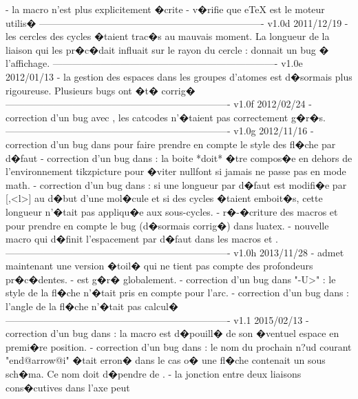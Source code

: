    - la macro \+ n'est plus explicitement �crite
    - v�rifie que eTeX est le moteur utilis�
----------------------------------------------------------------------
v1.0d      2011/12/19
    - les cercles des cycles �taient trac�s au mauvais moment. La
      longueur de la liaison qui les pr�c�dait influait sur le
      rayon du cercle :  donnait un bug
      � l'affichage.
----------------------------------------------------------------------
v1.0e      2012/01/13
    - la gestion des espaces dans les groupes d'atomes est
      d�sormais plus rigoureuse. Plusieurs bugs ont �t�
      corrig�
----------------------------------------------------------------------
v1.0f      2012/02/24
    - correction d'un bug avec , les catcodes n'�taient
      pas correctement g�r�s.
----------------------------------------------------------------------
v1.0g      2012/11/16
    - correction d'un bug dans \CF@direct@arrow pour faire prendre en
      compte le style des fl�che par d�faut
    - correction d'un bug dans \CF@lewis@c : la boite *doit* �tre
      compos�e en dehors de l'environnement tikzpicture pour
      �viter nullfont si jamais \printatom ne passe pas en mode
      math.
    - correction d'un bug dans \CF@chemfig@e : si une longueur par
      d�faut est modifi�e par [,<l>] au d�but d'une mol�cule
      et si des cycles �taient emboit�s, cette longueur n'�tait
      pas appliqu�e aux sous-cycles.
    - r�-�criture des macros \chemabove et \chembemow pour
      prendre en compte le bug (d�sormais corrig�) dans luatex.
    - nouvelle macro \setstacksep qui d�finit l'espacement par
      d�faut dans les macros \chemabove et \chembelow.
----------------------------------------------------------------------
v1.0h      2013/11/28
    - \chemname admet maintenant une version �toil� qui ne tient
      pas compte des profondeurs pr�c�dentes.
    - \CF@dp@max est g�r� globalement.
    - correction d'un bug dans "-U>" : le style de la fl�che
      n'�tait pris en compte pour l'arc.
    - correction d'un bug dans \CF@direct@arrow : l'angle de la
      fl�che n'�tait pas calcul�
----------------------------------------------------------------------
v1.1       2015/02/13
    - correction d'un bug dans \CF@seek@submol : la macro
      \CF@remain@molecule est d�pouill� de son �ventuel espace
      en premi�re position.
    - correction d'un bug dans \CF@arrow@f : le nom du prochain
      n?ud courant "end@arrow@i" �tait erron� dans le cas o� une
      fl�che contenait un sous sch�ma. Ce nom doit d�pendre de
      \CF@scheme@nest.
    - la jonction entre deux liaisons cons�cutives dans l'axe peut
